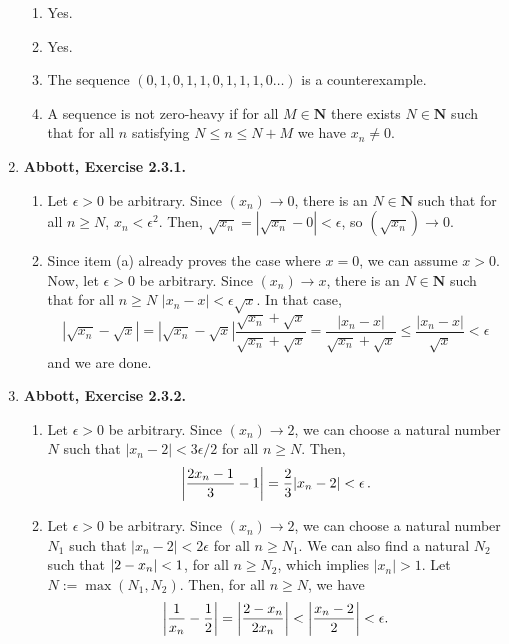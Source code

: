 \documentclass{article}
\DeclarePairedDelimiter\abs{\lvert}{\rvert}
\newcommand{\N}{\mathbf{N}}
\newcommand{\exc}[2][Abbott]{\item \textbf{#1, Exercise #2.}}
\let\oldmax\max
\renewcommand{\max}[1]{\oldmax \left( #1 \right)}
\begin{document}
\begin{enumerate}
	\begin{enumerate}
		\item Yes.
		\item Yes.
		\item The sequence $(0, 1, 0, 1, 1, 0, 1,1,1, 0 \dots)$ is a counterexample.
		\item A sequence is not zero-heavy if for all $M \in \N$ there exists $N \in \N$ such that for all $n$ satisfying $N \leq n \leq N + M$ we have $x_n \neq 0$.
	\end{enumerate}
				      	              
	\exc{2.3.1}
	\begin{enumerate}
		\item  Let $\epsilon > 0$ be arbitrary. Since $(x_n) \rightarrow 0$, there is an $N \in \N$ such that for all $n \geq N$, $x_n < \epsilon^2$. Then, $\sqrt{x_n} = |\sqrt{x_n} - 0| < \epsilon$, so $(\sqrt{x_n}) \rightarrow 0$.
		      		      		      	      	      	      	                  
		\item Since item (a) already proves the case where $x = 0$, we can assume $x > 0$. Now, let $\epsilon > 0$ be arbitrary. Since $(x_n) \rightarrow x$, there is an $N \in \N$ such that for all $n \geq N$ $|x_n-x| < \epsilon \sqrt{x}$. In that case, \begin{equation*}
		      |\sqrt{x_n}-\sqrt{x}| = |\sqrt{x_n}-\sqrt{x}| \frac{\sqrt{x_n}+ \sqrt{x}}{\sqrt{x_n}+ \sqrt{x}} = \frac{|x_n-x|}{\sqrt{x_n}+\sqrt{x}} \leq \frac{|x_n-x|}{\sqrt{x}} < \epsilon
		\end{equation*}
		and we are done.
	\end{enumerate}
				      	              
	\exc{2.3.2}
				      	              
	\begin{enumerate}
		\item Let $\epsilon > 0$ be arbitrary. Since $(x_n) \rightarrow 2$, we can choose a natural number $N$ such that $|x_n-2| < 3\epsilon/2$ for all $n \geq N$. Then, \begin{equation*}
		      \abs*{\frac{2x_n-1}{3}-1} = \frac{2}{3}|x_n-2| < \epsilon \, .
		\end{equation*}
							      		      	            
		\item Let $\epsilon > 0$ be arbitrary. Since $(x_n) \rightarrow 2$, we can choose a natural number $N_1$ such that $|x_n-2| < 2\epsilon$ for all $n \geq N_1$. We can also find a natural $N_2$ such that $\abs*{2-x_n} < 1$, for all $n \geq N_2$, which implies $|x_n| > 1$. Let $N := \max{N_1, N_2}$. Then, for all $n \geq N$, we have \begin{equation*}
		      \abs*{\frac{1}{x_n}-\frac{1}{2}} = \abs*{\frac{2-x_n}{2x_n}} < \abs*{\frac{x_n-2}{2}} < \epsilon.
		\end{equation*}
	\end{enumerate}
	

\end{enumerate}
\end{document}
